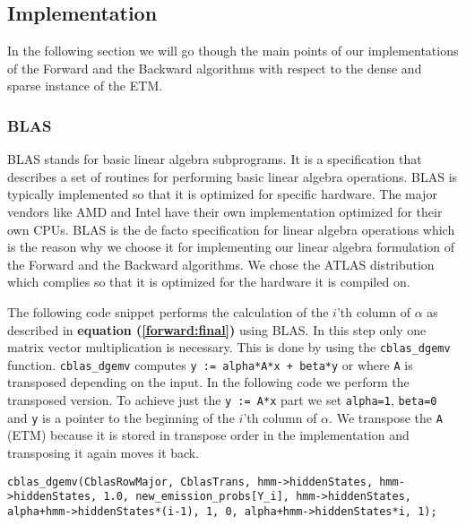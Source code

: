 \subsection{Implementation}\label{sec:impel}

In the following section we will go though the main points of our implementations of the Forward and the Backward algorithms with respect to the dense and sparse instance of the ETM.

\subsubsection{BLAS}\label{sec:blas}
BLAS\cite{blackford2002updated} stands for basic linear algebra subprograms. It is a specification that describes a set of routines for performing basic linear algebra operations. BLAS is typically implemented so that it is optimized for specific hardware. The major vendors like AMD\cite{amd} and Intel\cite{intel} have their own implementation optimized for their own CPUs. BLAS is the de facto specification for linear algebra operations which is the reason why we choose it for implementing our linear algebra formulation of the Forward and the Backward algorithms. We chose the ATLAS\cite{ATLAS} distribution which complies so that it is optimized for the hardware it is compiled on.


The following code snippet performs the calculation of the $i$'th column of $\alpha$ as described in \textbf{equation (\ref{forward:final})} using BLAS. In this step only one matrix vector multiplication is necessary. This is done by using the \texttt{cblas\_dgemv} function. \texttt{cblas\_dgemv} computes \texttt{y := alpha*A*x + beta*y} or where \texttt{A} is transposed depending on the input. In the following code we perform the transposed version. To achieve just the \texttt{y := A*x} part we set \texttt{alpha=1}, \texttt{beta=0} and \texttt{y} is a pointer to the beginning of the $i$'th column of $\alpha$. We transpose the \texttt{A} (ETM) because it is stored in transpose order in the implementation and transposing it again moves it back.


\begin{lstlisting}[style=CStyle]
cblas_dgemv(CblasRowMajor, CblasTrans, hmm->hiddenStates, hmm->hiddenStates, 1.0, new_emission_probs[Y_i], hmm->hiddenStates, alpha+hmm->hiddenStates*(i-1), 1, 0, alpha+hmm->hiddenStates*i, 1);
\end{lstlisting}



